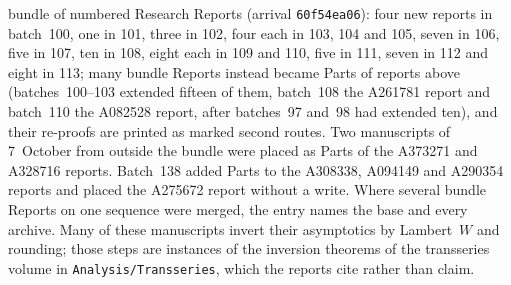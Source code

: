\documentclass[11pt]{article}
\newcommand{\dir}[1]{\texttt{#1}}
\begin{document}
bundle of numbered Research Reports (arrival \texttt{60f54ea06}): four new
reports in batch~100, one in 101, three in 102, four each in 103, 104 and
105, seven in 106, five in 107, ten in 108, eight each in 109 and 110,
five in 111, seven in 112 and eight in 113;
many bundle Reports instead became Parts of reports above (batches~100--103
extended fifteen of them, batch~108 the A261781 report and batch~110 the
A082528 report, after batches~97 and~98 had extended ten), and their
re-proofs are printed as marked second routes.  Two manuscripts of
7~October from outside the bundle were placed as Parts of the A373271 and
A328716 reports.  Batch~138 added Parts to the A308338, A094149 and A290354
reports and placed the A275672 report without a write.  Where
several bundle Reports on one sequence were merged, the entry names the
base and every archive.
Many of these manuscripts invert their asymptotics by Lambert~$W$ and
rounding; those steps are instances of the inversion theorems of the
transseries volume in \dir{Analysis/Transseries}, which the reports cite
rather than claim.
\end{document}
